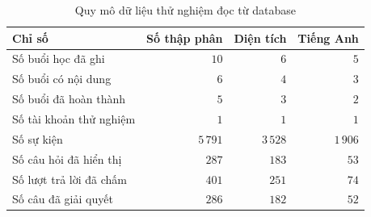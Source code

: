 \begin{table}[H]
\centering
\caption{Quy mô dữ liệu thử nghiệm đọc từ database}\label{tab:db-overview}
\begin{tabular}{lrrr}
\toprule
Chỉ số & Số thập phân & Diện tích & Tiếng Anh \\
\midrule
Số buổi học đã ghi & $10$ & $6$ & $5$ \\
Số buổi có nội dung & $6$ & $4$ & $3$ \\
Số buổi đã hoàn thành & $5$ & $3$ & $2$ \\
Số tài khoản thử nghiệm & $1$ & $1$ & $1$ \\
Số sự kiện & $5\,791$ & $3\,528$ & $1\,906$ \\
Số câu hỏi đã hiển thị & $287$ & $183$ & $53$ \\
Số lượt trả lời đã chấm & $401$ & $251$ & $74$ \\
Số câu đã giải quyết & $286$ & $182$ & $52$ \\
\bottomrule
\end{tabular}
\end{table}
